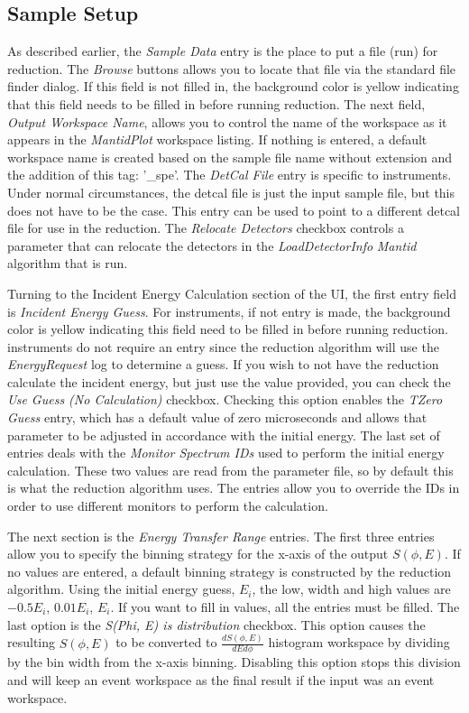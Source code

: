 \subsection{Sample Setup}
As described earlier, the \textit{Sample Data} entry is the place to put a file (run) for reduction. The \textit{Browse} buttons allows you to locate that file via the standard file finder dialog. If this field is not filled in, the background color is yellow indicating that this field needs to be filled in before running reduction. The next field, \textit{Output Workspace Name}, allows you to control the name of the workspace as it appears in the \textit{MantidPlot} workspace listing. If nothing is entered, a default workspace name is created based on the sample file name without extension and the addition of this tag: '\_spe'. The \textit{DetCal File} entry is specific to \isis{} instruments. Under normal circumstances, the detcal file is just the input sample file, but this does not have to be the case. This entry can be used to point to a different detcal file for use in the reduction. The \textit{Relocate Detectors} checkbox controls a parameter that can relocate the detectors in the \textit{LoadDetectorInfo} \textit{Mantid} algorithm that is run. 

Turning to the Incident Energy Calculation section of the UI, the first entry field is \textit{Incident Energy Guess}. For \isis{} instruments, if not entry is made, the background color is yellow indicating this field need to be filled in before running reduction. \sns{} instruments do not require an entry since the reduction algorithm will use the \textit{EnergyRequest} log to determine a guess. If you wish to not have the reduction calculate the incident energy, but just use the value provided, you can check the \textit{Use Guess (No Calculation)} checkbox. Checking this option enables the \textit{TZero Guess} entry, which has a default value of zero microseconds and allows that parameter to be adjusted in accordance with the initial energy. The last set of entries deals with the \textit{Monitor Spectrum IDs} used to perform the initial energy calculation. These two values are read from the parameter file, so by default this is what the reduction algorithm uses. The entries allow you to override the IDs in order to use different monitors to perform the calculation.

The next section is the \textit{Energy Transfer Range} entries. The first three entries allow you to specify the binning strategy for the x-axis of the output $S(\phi, E)$. If no values are entered, a default binning strategy is constructed by the reduction algorithm. Using the initial energy guess, $E_i$, the low, width and high values are $-0.5E_i$, $0.01E_i$, $E_i$. If you want to fill in values, all the entries must be filled. The last option is the \textit{S(Phi, E) is distribution} checkbox. This option causes the resulting $S(\phi, E)$ to be converted to $\frac{dS(\phi, E)}{dEd\phi}$ histogram workspace by dividing by the bin width from the x-axis binning. Disabling this option stops this division and will keep an event workspace as the final result if the input was an event workspace. 

